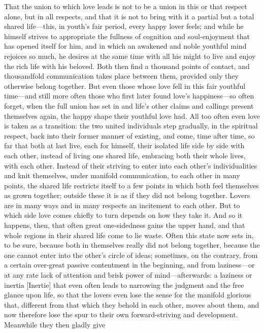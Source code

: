 \documentclass[12pt,a4paper]{book}
\begin{document}
That the union to which love leads is not to be a union in this or that
respect alone, but in all respects, and that it is not to bring with it a
partial but a total shared life---this, in youth's fair period, every happy
lover feels; and while he himself strives to appropriate the fullness of
cognition and soul-enjoyment that has opened itself for him, and in which
an awakened and noble youthful mind rejoices so much, he desires at the
same time with all his might to live and enjoy the rich life with his
beloved. Both then find a thousand points of contact, and thousandfold
communication takes place between them, provided only they otherwise belong
together. But even those whose love fell in this fair youthful time---and
still more often those who first later found love's happiness---so often
forget, when the full union has set in and life's other claims and callings
present themselves again, the happy shape their youthful love had. All too
often even love is taken as a transition: the two united individuals step
gradually, in the spiritual respect, back into their former manner of
existing, and come, time after time, so far that both at last live, each
for himself, their isolated life side by side with each other, instead of
living one shared life, embracing both their whole lives, with each other.
Instead of their striving to enter into each other's individualities and
knit themselves, under manifold communication, to each other in many
points, the shared life restricts itself to a few points in which both feel
themselves as grown together; outside these it is as if they did not belong
together. Lovers are in many ways and in many respects an incitement to
each other. But to which side love comes chiefly to turn depends on how
they take it. And so it happens, then, that often great one-sidedness gains
the upper hand, and that whole regions in their shared life come to lie
waste. Often this state now sets in, to be sure, because both in themselves
really did not belong together, because the one cannot enter into the
other's circle of ideas; sometimes, on the contrary, from a certain
over-great passive contentment in the beginning, and from laziness---or at
any rate lack of attention and brisk power of mind---afterwards: a laziness
or inertia [Inertie] that even often leads to narrowing the judgment and
the free glance upon life, so that the lovers even lose the sense for the
manifold glorious that, different from that which they behold in each
other, moves about them, and now therefore lose the spur to their own
forward-striving and development. Meanwhile they then gladly give
\end{document}
